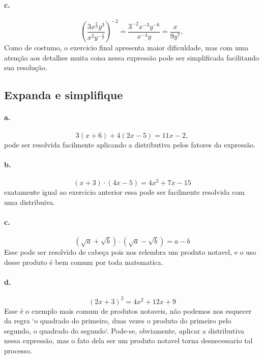 \documentclass{article}
\begin{document}
	\paragraph{c.}
	\begin{equation}
	\left(\frac{3x^{\frac{3}{2}}y^3}{x^2y^{-\frac{1}{2}}}\right)^{-2} = \frac{3^{-2}x^{-3}y^{-6}}{x^{-4}y} = \frac{x}{9y^7},
	\end{equation}
	Como de costumo, o exercicio final apresenta maior dificuldade, mas com uma atenção aos detalhes muita coisa nessa expressão pode ser simplificada facilitando sua resolução.


\subsection{Expanda e simplifique}
	
	\paragraph{a.}
	\begin{equation}
	3(x+6)+4(2x-5) = 11x - 2,
	\end{equation}
	pode ser resolvida facilmente aplicando a distributiva pelos fatores da expressão.

	\paragraph{b.}
	\begin{equation}
	(x+3)\cdot(4x-5) = 4x^2 + 7x - 15
	\end{equation}
	exatamente igual ao exercicio anterior essa pode ser facilmente resolvida com uma distribuiva.

	\paragraph{c.}
	\begin{equation}
	(\sqrt{a} + \sqrt{b})\cdot(\sqrt{a} - \sqrt{b}) = a -b
	\end{equation}
	Esse pode ser resolvido de cabeça pois nos relembra um produto notavel, e o uso desse produto é bem comum por toda matematica.

	\paragraph{d.}
	\begin{equation}
	(2x+3)^2 = 4x^2+12x+9
	\end{equation}
	Esse é o exemplo mais comum de produtos notaveis, não podemos nos esquecer da regra `o quadrado do primeiro, duas vezes o produto do primeiro pelo segundo, o quadrado do segundo`. Pode-se, obviamente, aplicar a distributiva nessa expressão, mas o fato dela ser um produto notavel torna desnecessario tal processo.
\end{document}
